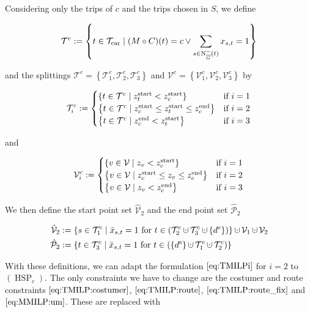 Considering only the trips of $c$ and the trips chosen in $S$, we define

\begin{align*}
	\mathcal{T}^c := \left\{t\in\mathcal{T}_{\operatorname{car}}\mid(M\circ C)(t)=c\lor \sum_{s\in\operatorname{N}_{\overline{G}}^-(t)} x_{s,t}=1\right\}
\end{align*}

and the splittings $\mathcal{T}^c=\left\{\mathcal{T}^c_1,\mathcal{T}^c_2,\mathcal{T}^c_3\right\}$ and $\mathcal{V}^c=\left\{\mathcal{V}^c_1,\mathcal{V}^c_2,\mathcal{V}^c_3\right\}$ by

\begin{align*}
	\mathcal{T}^c_i := \begin{cases}
		\left\{t\in\mathcal{T}^c\mid z^{\operatorname{start}}_t<z^{\operatorname{start}}_c\right\} & \text{if } i=1 \\
		\left\{t\in\mathcal{T}^c\mid z^{\operatorname{start}}_c\leq z^{\operatorname{start}}_t\leq z^{\operatorname{end}}_c\right\} & \text{if } i=2 \\
		\left\{t\in\mathcal{T}^c\mid z^{\operatorname{end}}_c<z^{\operatorname{start}}_t\right\} & \text{if } i=3
	\end{cases}
\end{align*}

and

\begin{align*}
	\mathcal{V}^c_i := \begin{cases}
		\left\{v\in\mathcal{V}\mid z_v<z^{\operatorname{start}}_c\right\} & \text{if } i=1 \\
		\left\{v\in\mathcal{V}\mid z^{\operatorname{start}}_c\leq z_v\leq z^{\operatorname{end}}_c\right\} & \text{if } i=2 \\
		\left\{v\in\mathcal{V}\mid z_v<z^{\operatorname{end}}_c\right\} & \text{if } i=3
	\end{cases}
\end{align*}

We then define the start point set $\hat{\mathcal{V}}_2$ and the end point set $\hat{\mathcal{P}}_2$

\begin{align*}
	\hat{\mathcal{V}}_2 & := \left\{s\in\mathcal{T}^c_1\mid \bar{x}_{s,t}=1\text{ for }t\in\left(\mathcal{T}^c_2\cupdot\mathcal{T}^c_3\cupdot\left\{\de\right\}\right)\right\}\cupdot\mathcal{V}_1\cupdot\mathcal{V}_2 \\
	\hat{\mathcal{P}}_2 & := \left\{t\in\mathcal{T}^c_3\mid \bar{x}_{s,t}=1\text{ for }t\in\left(\left\{\ds\right\}\cupdot\mathcal{T}^c_1\cupdot\mathcal{T}^c_2\right)\right\}
\end{align*}

With these definitions, we can adapt the formulation $\eqref{eq:TMILPi}$ for $i=2$ to $(\operatorname{HSP}_c)$. The only constraints we have to change are the costumer and route constraints $\eqref{eq:TMILP:costumer}$, $\eqref{eq:TMILP:route}$, $\eqref{eq:TMILP:route_fix}$ and $\eqref{eq:MMILP:um}$. These are replaced with

